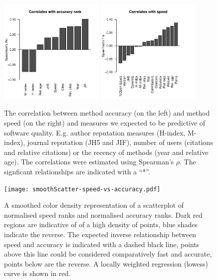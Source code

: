 \documentclass[fleqn,10pt]{SelfArx} %
\begin{document}
\begin{figure}[H]
\centering
\includegraphics[width=0.45\textwidth]{spearmanBarplot.pdf}
\includegraphics[width=0.45\textwidth]{spearmanBarplotSpeed.pdf}
\caption{The correlation between method accuracy (on the left) and
  method speed (on the right) and measures we expected to be
  predictive of software quality. E.g. author reputation measures
  (H-index, M-index), journal reputation (JH5 and JIF), number of
  users (citations and relative citations) or the recency of methods
  (year and relative age).  The correlations were estimated using
  Spearman's $\rho$. The signficant relationships are indicated with a
  ``*''. }
\label{fig:S2}
\end{figure}


\begin{figure}[H]
\centering
\texttt{[image: smoothScatter-speed-vs-accuracy.pdf]}
\caption{A smoothed color density representation of a scatterplot of
  normalised speed ranks and normalised accuracy ranks. Dark red
  regions are indicative of of a high density of points, blue shades
  indicate the reverse. The expected inverse relationship between
  speed and accuracy is indicated with a dashed black line, points
  above this line could be considered comparatively fast and accurate,
  points below are the reverse. A locally weighted regression (lowess)
  curve is shown in red.}
\label{fig:smoothScatterAccSpeed}
\end{figure}
\end{document}
